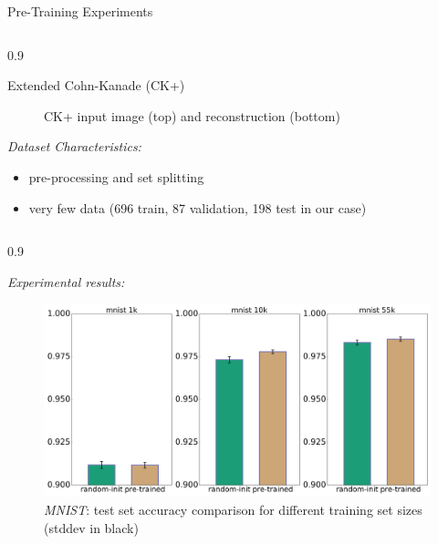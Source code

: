 \documentclass[final]{beamer}
\newlength{\onecolwid}
\newlength{\threecolwid}
\begin{document}
\begin{frame}[t]
\begin{columns}[t]
\begin{column}{\threecolwid}
\begin{alertblock}{Pre-Training Experiments}
\begin{columns}[t, totalwidth=0.9\threecolwid]
\begin{column}{0.9\onecolwid}
\begin{block}{Extended Cohn-Kanade (CK+)}
\begin{figure}
	\caption{CK+ input image (top) and reconstruction (bottom)}
	\end{figure}

	\emph{Dataset Characteristics:}\\
	\begin{itemize} 
		\item pre-processing and set splitting %
		\item very few data (696 train, 87 validation, 198 test in our case)
	\end{itemize}

	\end{block}

	\end{column}

\end{columns}


\begin{columns}[t, totalwidth=0.9\threecolwid] %


	\begin{column}{0.9\onecolwid} %
	\begin{block}{}
	\emph{Experimental results:}

	\begin{figure}
	\includegraphics[width=\linewidth]{../box_plots/boxplots_mnist.png}
	\caption{\emph{MNIST}: test set accuracy comparison for different training set sizes (stddev in black)}
	\label{fig:mnist_plot}
	\end{figure}


\end{block}
\end{column}
\end{columns}
\end{alertblock}
\end{column}
\end{columns}
\end{frame}
\end{document}
